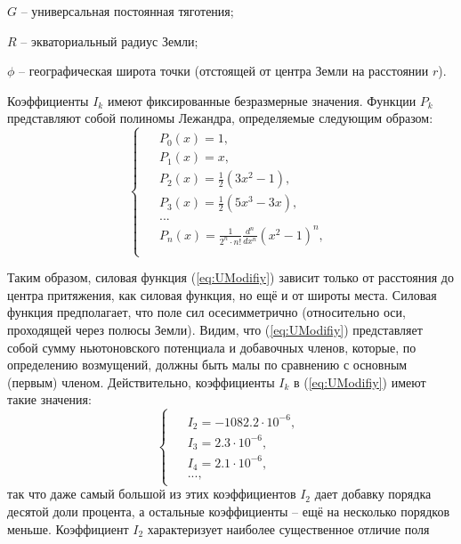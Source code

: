 $G$ -- универсальная постоянная тяготения;

$R$ -- экваториальный радиус Земли;

$\phi$ -- географическая широта точки (отстоящей от центра Земли на
расстоянии $r$).

Коэффициенты $I_k$ имеют фиксированные безразмерные значения.
Функции $P_k$ представляют собой полиномы Лежандра, определяемые следующим образом:
\begin{equation}
  \begin{cases}
    \begin{aligned}
      & P_0(x) = 1, \\
      & P_1(x) = x, \\
      & P_2(x) = \frac{1}{2}(3x^2 - 1), \\
      & P_3(x) = \frac{1}{2}(5x^3 - 3x), \\
      & ...\\
      & P_n(x) = \frac{1}{2^n \cdot n!}\frac{d^n}{dx^n}(x^2 - 1)^n, \\
    \end{aligned}
  \end{cases}
\end{equation}\par
Таким образом, силовая функция (\ref{eq:UModifiy}) зависит только от расстояния
до центра притяжения, как силовая функция, но ещё и от широты места. Силовая
функция предполагает, что поле сил осесимметрично (относительно оси, проходящей
через полюсы Земли). Видим, что (\ref{eq:UModifiy}) представляет собой сумму
ньютоновского потенциала и добавочных членов, которые, по определению возмущений,
должны быть малы по сравнению с основным (первым) членом. Действительно,
коэффициенты $I_k$ в (\ref{eq:UModifiy}) имеют такие значения:
\begin{equation}
  \begin{cases}
    \begin{aligned}
      & I_2 = -1082.2\cdot10^{-6}, \\
      & I_3 = 2.3\cdot10^{-6}, \\
      & I_4 = 2.1\cdot10^{-6}, \\
      & ...,
    \end{aligned}
  \end{cases}
\end{equation}
так что даже самый большой из этих коэффициентов $I_2$ дает добавку порядка
десятой доли процента, а остальные коэффициенты -- ещё на несколько порядков
меньше. Коэффициент $I_2$ характеризует наиболее существенное отличие поля
